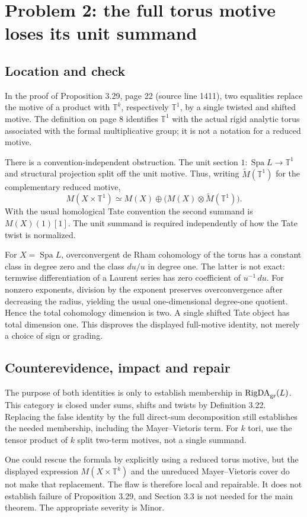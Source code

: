 \documentclass[10pt]{article}
\begin{document}
\section*{Problem 2: the full torus motive loses its unit summand}
\subsection*{Location and check}
In the proof of Proposition 3.29, page 22 (source line 1411), two equalities replace the motive of a product with \(\mathbb T^k\), respectively \(\mathbb T^1\), by a single twisted and shifted motive. The definition on page 8 identifies \(\mathbb T^1\) with the actual rigid analytic torus associated with the formal multiplicative group; it is not a notation for a reduced motive.\par
There is a convention-independent obstruction. The unit section \(1:\operatorname{Spa}L\to\mathbb T^1\) and structural projection split off the unit motive. Thus, writing \(\widetilde M(\mathbb T^1)\) for the complementary reduced motive, \[M(X\times\mathbb T^1)
 \simeq M(X)\oplus
       \bigl(M(X)\otimes\widetilde M(\mathbb T^1)\bigr).\] With the usual homological Tate convention the second summand is \(M(X)(1)[1]\). The unit summand is required independently of how the Tate twist is normalized.\par
For \(X=\operatorname{Spa}L\), overconvergent de Rham cohomology of the torus has a constant class in degree zero and the class \(d u/u\) in degree one. The latter is not exact: termwise differentiation of a Laurent series has zero coefficient of \(u^{-1}\,du\). For nonzero exponents, division by the exponent preserves overconvergence after decreasing the radius, yielding the usual one-dimensional degree-one quotient. Hence the total cohomology dimension is two. A single shifted Tate object has total dimension one. This disproves the displayed full-motive identity, not merely a choice of sign or grading.\par
\subsection*{Counterevidence, impact and repair}
The purpose of both identities is only to establish membership in \(\operatorname{RigDA}_{\rm gr}(L)\). This category is closed under sums, shifts and twists by Definition 3.22. Replacing the false identity by the full direct-sum decomposition still establishes the needed membership, including the Mayer–Vietoris term. For \(k\) tori, use the tensor product of \(k\) split two-term motives, not a single summand.\par
One could rescue the formula by explicitly using a reduced torus motive, but the displayed expression \(M(X\times\mathbb T^k)\) and the unreduced Mayer–Vietoris cover do not make that replacement. The flaw is therefore local and repairable. It does not establish failure of Proposition 3.29, and Section 3.3 is not needed for the main theorem. The appropriate severity is Minor.\par
\end{document}
